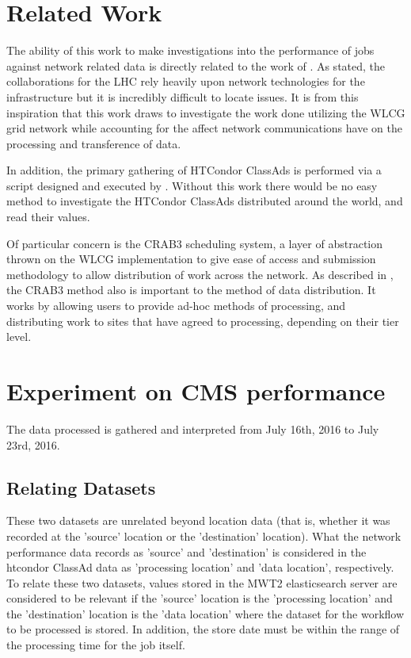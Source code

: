 \documentclass[print,ms]{nuthesis}
\begin{document}
\chapter{Related Work}
\label{sec:RelatedWork}
The ability of this work to make investigations into the performance of jobs against network related data is directly related to the work of \cite{shawn}. As stated, the collaborations for the LHC rely heavily upon network technologies for the infrastructure but it is incredibly difficult to locate issues. It is from this inspiration that this work draws to investigate the work done utilizing the WLCG grid network while accounting for the affect network communications have on the processing and transference of data.

In addition, the primary gathering of HTCondor ClassAds is performed via a script designed and executed by \cite{brian}. Without this work there would be no easy method to investigate the HTCondor ClassAds distributed around the world, and read their values.

Of particular concern is the CRAB3 scheduling system, a layer of abstraction thrown on the WLCG implementation to give ease of access and submission methodology to allow distribution of work across the network. As described in \cite{crab}, the CRAB3 method also is important to the method of data distribution. It works by allowing users to provide ad-hoc methods of processing, and distributing work to sites that have agreed to processing, depending on their tier level.
\chapter{Experiment on CMS performance}
The data processed is gathered and interpreted from July 16th, 2016 to July 23rd, 2016.
\section{Relating Datasets}
These two datasets are unrelated beyond location data (that is, whether it was recorded at the 'source' location or the 'destination' location). What the network performance data records as 'source' and 'destination' is considered in the htcondor ClassAd data as 'processing location' and 'data location', respectively. To relate these two datasets, values stored in the MWT2 elasticsearch server are considered to be relevant if the 'source' location is the 'processing location' and the 'destination' location is the 'data location' where the dataset for the workflow to be processed is stored. In addition, the store date must be within the range of the processing time for the job itself. 
\end{document}
